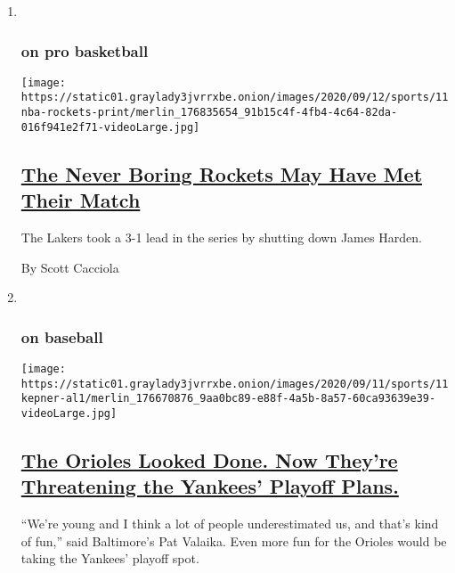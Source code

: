 \begin{enumerate}
\def\labelenumi{\arabic{enumi}.}
\item ~
  \hypertarget{on-pro-basketball}{%
  \subsubsection{on pro basketball}\label{on-pro-basketball}}

  \texttt{[image: https://static01.graylady3jvrrxbe.onion/images/2020/09/12/sports/11nba-rockets-print/merlin\_176835654\_91b15c4f-4fb4-4c64-82da-016f941e2f71-videoLarge.jpg]}

  \hypertarget{the-never-boring-rockets-may-have-met-their-match}{%
  \subsection{\texorpdfstring{\href{/2020/09/11/sports/rockets-lakers-nba.html}{The
  Never Boring Rockets May Have Met Their
  Match}}{The Never Boring Rockets May Have Met Their Match}}\label{the-never-boring-rockets-may-have-met-their-match}}

  The Lakers took a 3-1 lead in the series by shutting down James
  Harden.

  By Scott Cacciola
\item ~
  \hypertarget{on-baseball}{%
  \subsubsection{on baseball}\label{on-baseball}}

  \texttt{[image: https://static01.graylady3jvrrxbe.onion/images/2020/09/11/sports/11kepner-al1/merlin\_176670876\_9aa0bc89-e88f-4a5b-8a57-60ca93639e39-videoLarge.jpg]}

  \hypertarget{the-orioles-looked-done-now-theyre-threatening-the-yankees-playoff-plans}{%
  \subsection{\texorpdfstring{\href{/2020/09/11/sports/baseball/orioles-yankees-playoffs.html}{The
  Orioles Looked Done. Now They're Threatening the Yankees' Playoff
  Plans.}}{The Orioles Looked Done. Now They're Threatening the Yankees' Playoff Plans.}}\label{the-orioles-looked-done-now-theyre-threatening-the-yankees-playoff-plans}}

  ``We're young and I think a lot of people underestimated us, and
  that's kind of fun,'' said Baltimore's Pat Valaika. Even more fun for
  the Orioles would be taking the Yankees' playoff spot.


\end{enumerate}
